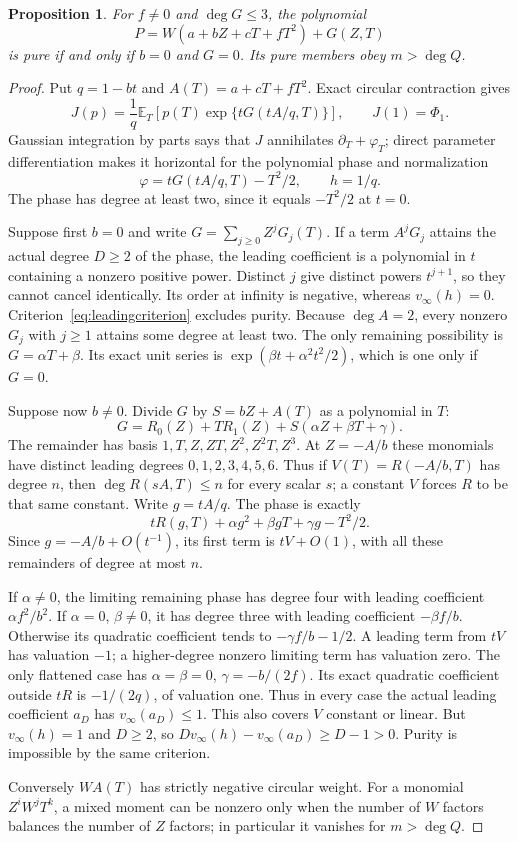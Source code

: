 \documentclass[11pt]{article}
\newtheorem{proposition}[theorem]{Proposition}
\theoremstyle{definition}\newtheorem{definition}[theorem]{Definition}
\theoremstyle{remark}\newtheorem{remark}[theorem]{Remark}
\newcommand{\E}{\mathbb E}
\begin{document}
\begin{proposition}\label{prop:rankoneformal}
For $f\ne0$ and $\deg G\leq3$, the polynomial
\[
 P=W(a+bZ+cT+fT^2)+G(Z,T)
\]
is pure if and only if $b=0$ and $G=0$. Its pure members obey
$m>\deg Q$.
\end{proposition}
\begin{proof}
Put $q=1-bt$ and $A(T)=a+cT+fT^2$. Exact circular contraction
gives
\[
 J(p)=\frac1q\E_T\!\left[p(T)
             \exp\{tG(tA/q,T)\}\right],\qquad J(1)=\Phi_1.
\]
Gaussian integration by parts says that $J$ annihilates
$\partial_T+\varphi_T$; direct parameter differentiation makes it
horizontal for the polynomial phase and normalization
\[
 \varphi=tG(tA/q,T)-T^2/2,\qquad h=1/q.
\]
The phase has degree at least two, since it equals $-T^2/2$ at $t=0$.

Suppose first $b=0$ and write $G=\sum_{j\geq0}Z^jG_j(T)$.
If a term $A^jG_j$ attains the actual degree $D\geq2$ of the phase,
the leading coefficient is a polynomial in $t$ containing a
nonzero positive power. Distinct $j$ give distinct powers $t^{j+1}$,
so they cannot cancel identically. Its order at infinity is negative,
whereas $v_\infty(h)=0$. Criterion~\eqref{eq:leadingcriterion}
excludes purity. Because $\deg A=2$, every nonzero $G_j$ with
$j\geq1$ attains some degree at least two. The only remaining
possibility is $G=\alpha T+\beta$. Its exact unit series is
$\exp(\beta t+\alpha^2t^2/2)$, which is one only if $G=0$.

Suppose now $b\ne0$. Divide $G$ by $S=bZ+A(T)$ as a polynomial
in $T$:
\[
 G=R_0(Z)+TR_1(Z)+S(\alpha Z+\beta T+\gamma).
\]
The remainder has basis $1,T,Z,ZT,Z^2,Z^2T,Z^3$. At $Z=-A/b$
these monomials have distinct leading degrees $0,1,2,3,4,5,6$.
Thus if $V(T)=R(-A/b,T)$ has degree $n$, then
$\deg R(sA,T)\leq n$ for every scalar $s$; a constant $V$
forces $R$ to be that same constant. Write $g=tA/q$. The phase is
exactly
\[
 tR(g,T)+\alpha g^2+\beta gT+\gamma g-T^2/2.
\]
Since $g=-A/b+O(t^{-1})$, its first term is $tV+O(1)$, with
all these remainders of degree at most $n$.

If $\alpha\ne0$, the limiting remaining phase has degree four
with leading coefficient $\alpha f^2/b^2$. If $\alpha=0$,
$\beta\ne0$, it has degree three with leading coefficient
$-\beta f/b$. Otherwise its quadratic coefficient tends to
$-\gamma f/b-1/2$. A leading term from $tV$ has valuation $-1$;
a higher-degree nonzero limiting term has valuation zero.
The only flattened case has
$\alpha=\beta=0$, $\gamma=-b/(2f)$. Its exact quadratic
coefficient outside $tR$ is $-1/(2q)$, of valuation one.
Thus in every case the actual leading coefficient $a_D$ has
$v_\infty(a_D)\leq1$. This also covers $V$ constant or linear.
But $v_\infty(h)=1$ and $D\geq2$, so
$Dv_\infty(h)-v_\infty(a_D)\geq D-1>0$.
Purity is impossible by the same criterion.

Conversely $W A(T)$ has strictly negative circular weight.
For a monomial $Z^iW^jT^k$, a mixed moment can be nonzero only
when the number of $W$ factors balances the number of $Z$ factors;
in particular it vanishes for $m>\deg Q$.
\end{proof}
\end{document}

